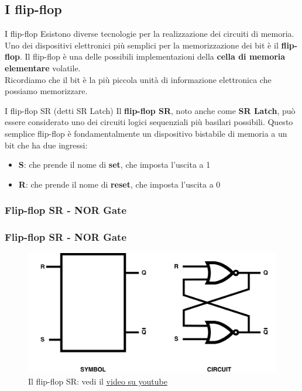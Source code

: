 \subsection[I flip-flop]{I flip-flop}
\begin{frame}
	
	\begin{block}{I flip-flop}
		Esistono diverse tecnologie per la realizzazione dei circuiti di memoria. Uno dei dispositivi elettronici più semplici per la memorizzazione dei bit è il \textbf{flip-flop}. Il flip-flop è una delle possibili implementazioni della \textbf{cella di memoria elementare} volatile. \\ Ricordiamo che il bit è la più piccola unità di informazione elettronica che possiamo memorizzare.
	\end{block}
	
	\begin{block}{I flip-flop SR (detti SR Latch)}
		Il \textbf{flip-flop SR}, noto anche come \textbf{SR Latch}, può essere considerato uno dei circuiti logici sequenziali più basilari possibili. Questo semplice flip-flop è fondamentalmente un dispositivo bistabile di memoria a un bit che ha due ingressi:
		\begin{itemize} 
			\item \textbf{S}: che prende il nome di \textbf{set}, che imposta l'uscita a 1
			\item \textbf{R}: che prende il nome di \textbf{reset}, che imposta l'uscita a 0
		\end{itemize}
	\end{block}
	
\end{frame}


\subsubsection[Flip-flop SR - NOR Gate]{Flip-flop SR - NOR Gate}
\begin{frame}
	\frametitle{Flip-flop SR - NOR Gate}
	 
	\begin{figure}[!htbp] 
		\centering
		\includegraphics[width=0.95\linewidth]{images/5_memory/flip_flop_sr_nor.pdf}
		\caption{Il flip-flop SR: vedi il \underline{\href{https://www.youtube.com/watch?v=br2pbjAnP2k}{video su youtube}}}
	\end{figure}
	
\end{frame}

